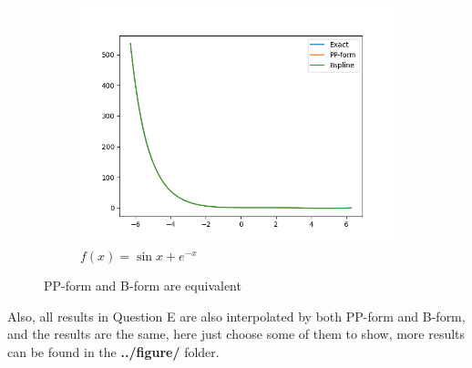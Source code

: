 \documentclass[a4paper]{article}
\begin{document}
\begin{figure}[H]
\begin{subfigure}[b]{0.45\textwidth}
        \centering
        \includegraphics[width=\textwidth]{../figure/SplineTest3.png}
        \caption{$f(x) = \sin x + e^{-x}$}
    \end{subfigure}
    \caption{PP-form and B-form are equivalent}
    \label{FIG:APPENDIX1:1}
\end{figure}

Also, all results in Question E are also interpolated by both PP-form and B-form, and the results are the same, here just choose some of them to show, more results can be found in the \textbf{../figure/} folder.
\end{document}
